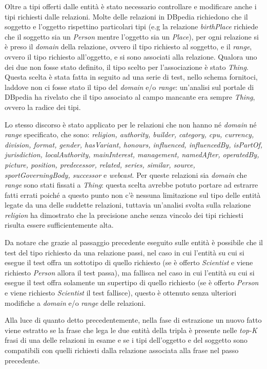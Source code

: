 \documentclass[10pt,a4paper,twocolumn]{article}
\begin{document}
Oltre a tipi offerti dalle entità è stato necessario controllare e modificare anche i tipi richiesti dalle relazioni. Molte delle relazioni in DBpedia richiedono che il soggetto e l'oggetto rispettino particolari tipi (e.g la relazione \textit{birthPlace} richiede che il soggetto sia un \textit{Person} mentre l'oggetto sia un \textit{Place}), per ogni relazione si è preso il \textit{domain} della relazione, ovvero il tipo richiesto al soggetto, e il \textit{range}, ovvero il tipo richiesto all'oggetto, e si sono associati alla relazione. Qualora uno dei due non fosse stato definito, il tipo scelto per l'associazione è stato \textit{Thing}. Questa scelta è stata fatta in seguito ad una serie di test, nello schema fornitoci, laddove non ci fosse stato il tipo del \textit{domain} e/o \textit{range}: un'analisi sul portale di DBpedia ha rivelato che il tipo associato al campo mancante era sempre \textit{Thing}, ovvero la radice dei tipi.

Lo stesso discorso è stato applicato per le relazioni che non hanno né \textit{domain} né \textit{range} specificato, che sono: \textit{religion, authority, builder, category, cpu, currency, division, format, gender, hasVariant, honours, influenced, influencedBy, isPartOf, jurisdiction, localAuthority, mainInterest, management, namedAfter, operatedBy, picture, position, predecessor, related, series, similar, source, sportGoverningBody, successor} e \textit{webcast}. Per queste relazioni sia \textit{domain} che \textit{range} sono stati fissati a \textit{Thing}: questa scelta avrebbe potuto portare ad estrarre fatti errati poiché a questo punto non c'è nessuna limitazione sul tipo delle entità legate da una delle suddette relazioni, tuttavia un'analisi svolta sulla relazione \textit{religion} ha dimostrato che la precisione anche senza vincolo dei tipi richiesti risulta essere sufficientemente alta. 

Da notare che grazie al passaggio precedente eseguito sulle entità è possibile che il test del tipo richiesto da una relazione passi, nel caso in cui l'entità su cui si esegue il test offra un sottotipo di quello richiesto (se è offerto \textit{Scientist} e viene richiesto \textit{Person} allora il test passa), ma fallisca nel caso in cui l'entità su cui si esegue il test offra solamente un supertipo di quello richiesto (se è offerto \textit{Person} e viene richiesto \textit{Scientist} il test fallisce), questo è ottenuto senza ulteriori modifiche a \textit{domain} e/o \textit{range} delle relazioni.

Alla luce di quanto detto precedentemente, nella fase di estrazione un nuovo fatto viene estratto se la frase che lega le due entità della tripla è presente nelle \textit{top-K} frasi di una delle relazioni in esame e se i tipi dell'oggetto e del soggetto sono compatibili con quelli richiesti dalla relazione associata alla frase nel passo precedente.  
\end{document}

